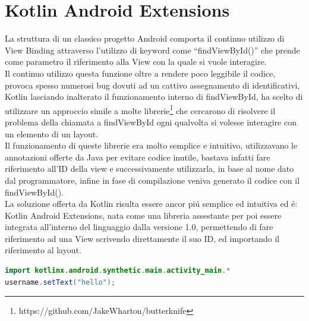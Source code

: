 \section{ Kotlin Android Extensions }
La struttura di un classico progetto Android comporta il continuo utilizzo di View Binding attraverso l'utilizzo di keyword come ``findViewById()'' che prende come parametro il riferimento alla View con la quale si vuole interagire. \\
Il continuo utilizzo questa funzione oltre a rendere poco leggibile il codice, provoca spesso numerosi bug dovuti ad un cattivo assegnamento di identificativi, Kotlin lasciando inalterato il funzionamento interno di findViewById, ha scelto di utilizzare un approccio simile a molte librerie\footnote{https://github.com/JakeWharton/butterknife} che cercarono di risolvere il problema della chiamata a findViewById ogni qualvolta si volesse interagire con un elemento di un layout.\\
Il funzionamento di queste librerie era molto semplice e intuitivo, utilizzavano le annotazioni offerte da Java per evitare codice inutile, bastava infatti fare riferimento all'ID della view e successivamente utilizzarla, in base al nome dato dal programmatore, infine in fase di compilazione veniva generato il codice con il findViewById().\\
La soluzione offerta da Kotlin risulta essere ancor pi\'u semplice ed intuitiva ed \'e: Kotlin Android Extensions, nata come una libreria assestante per poi essere integrata all'interno del linguaggio dalla versione 1.0, permettendo di fare riferimento ad una View scrivendo direttamente il suo ID, ed importando il riferimento al layout.

%

\begin{lstlisting}[language=java,caption={Esempio KAE}]
import kotlinx.android.synthetic.main.activity_main.*
username.setText("hello");
\end{lstlisting}

\clearpage{\pagestyle{empty}\cleardoublepage}

